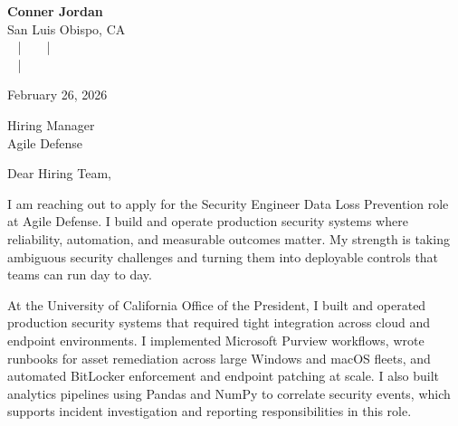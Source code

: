 \documentclass[letterpaper,11pt]{article}
\newcommand{\companyname}{Agile Defense}
\begin{document}
\begin{center}
  {\Huge \textbf{Conner Jordan}}\\[4pt]
  {\Large San Luis Obispo, CA}\\[4pt]
  \href{tel:+18059759793}{
    } ~ | ~
  \href{mailto:connercharlesjordan@gmail.com}{
    } ~ | ~
   \\
  \href{https://www.linkedin.com/in/conner-jordan-4b268514a/}{
    } ~ | ~
  \href{https://github.com/cjordan223}{
    }
\end{center}

\vspace{16pt}

\begin{flushright}
February 26, 2026
\end{flushright}

Hiring Manager\\
\companyname

\vspace{26pt}

\noindent
Dear Hiring Team,

\vspace{16pt}

I am reaching out to apply for the Security Engineer Data Loss Prevention role at Agile Defense. I build and operate production security systems where reliability, automation, and measurable outcomes matter. My strength is taking ambiguous security challenges and turning them into deployable controls that teams can run day to day.

\vspace{16pt}

At the University of California Office of the President, I built and operated production security systems that required tight integration across cloud and endpoint environments. I implemented Microsoft Purview workflows, wrote runbooks for asset remediation across large Windows and macOS fleets, and automated BitLocker enforcement and endpoint patching at scale. I also built analytics pipelines using Pandas and NumPy to correlate security events, which supports incident investigation and reporting responsibilities in this role.
\end{document}
